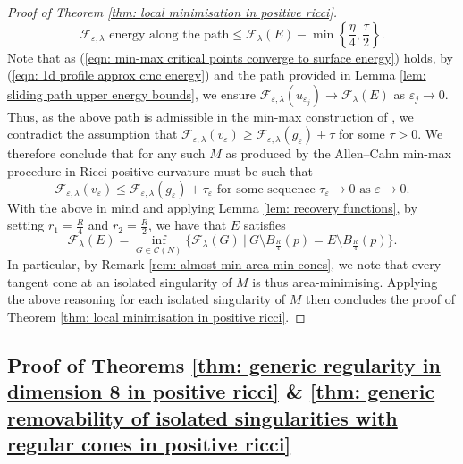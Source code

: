 \documentclass[11pt]{article}
\begin{document}
\begin{proof}[Proof of Theorem \ref{thm: local minimisation in positive ricci}]
\begin{equation*}
    \text{$\mathcal{F}_{\varepsilon,\lambda}$ energy along the path} \leq \mathcal{F}_\lambda(E) - \min\left\{\frac{\eta}{4},\frac{\tau}{2} \right\}.
\end{equation*}
Note that as (\ref{eqn: min-max critical points converge to surface energy}) holds, by (\ref{eqn: 1d profile approx cmc energy}) and the path provided in Lemma \ref{lem: sliding path upper energy bounds}, we ensure $\mathcal{F}_{\varepsilon,\lambda}(u_{\varepsilon_j}) \rightarrow \mathcal{F}_{\lambda}(E)$ as $\varepsilon_j \rightarrow 0$. Thus, as the above path is admissible in the min-max construction of \cite{bellettini-wickramasekera}, we contradict the assumption that $ \mathcal{F}_{\varepsilon,\lambda}(v_\varepsilon) \geq \mathcal{F}_{\varepsilon,\lambda}(g_\varepsilon) + \tau$ for some $\tau > 0$. We therefore conclude that for any such $M$ as produced by the Allen--Cahn min-max procedure in Ricci positive curvature must be such that 
\begin{equation*}
   \mathcal{F}_{\varepsilon,\lambda}(v_\varepsilon) \leq \mathcal{F}_{\varepsilon,\lambda}(g_\varepsilon) + \tau_\varepsilon \text{ for some sequence } \tau_\varepsilon \rightarrow 0 \text{ as } \varepsilon \rightarrow 0.
\end{equation*}
With the above in mind and applying Lemma \ref{lem: recovery functions}, by setting $r_1 = \frac{R}{4}$ and $r_2 = \frac{R}{2}$, we have that $E$ satisfies
\begin{equation*}
    \mathcal{F}_\lambda(E) = \inf_{G \in \mathcal{C}(N)} \{\mathcal{F}_\lambda(G) \: | \: G \setminus B_\frac{R}{4}(p) = E \setminus B_\frac{R}{4} (p)\}.
\end{equation*}
In particular, by Remark \ref{rem: almost min area min cones}, we note that every tangent cone at an isolated singularity of $M$ is thus area-minimising. Applying the above reasoning for each isolated singularity of $M$ then concludes the proof of Theorem \ref{thm: local minimisation in positive ricci}.
\end{proof}

\subsection{Proof of Theorems \ref{thm: generic regularity in dimension 8 in positive ricci} \& \ref{thm: generic removability of isolated singularities with regular cones in positive ricci}}
\end{document}
